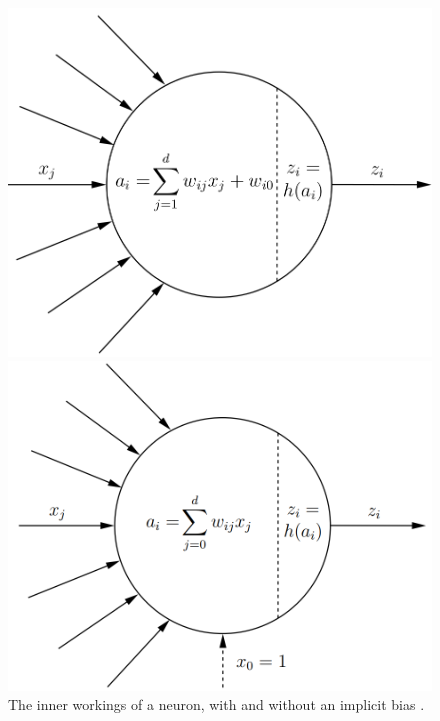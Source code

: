 \begin{figure}[!tbp]
  \centering
  \begin{minipage}[b]{0.45\textwidth}
    \includegraphics[width=\textwidth]{./pictures/method/Neuron.png}
  \end{minipage}
  \hfill
  \begin{minipage}[b]{0.45\textwidth}
    \includegraphics[width=\textwidth]{./pictures/method/NeuronBias.png}
  \end{minipage}
    \caption{The inner workings of a neuron, with and without an implicit
        bias \citep{Igel}.}
\label{fig:neuron}
\end{figure}

